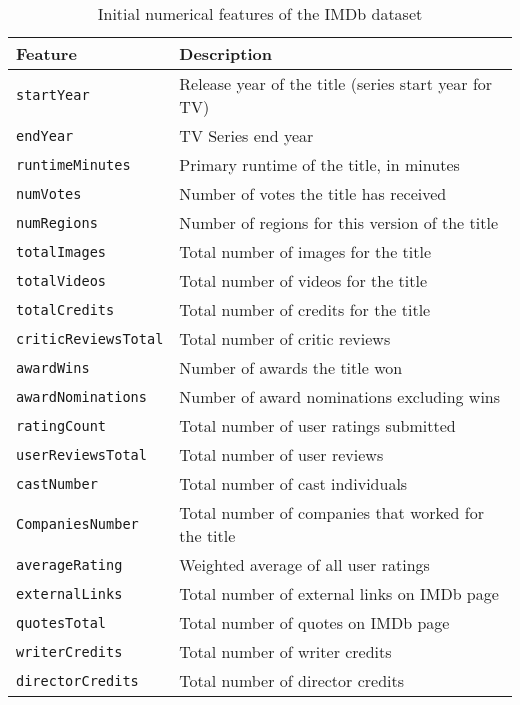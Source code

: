 \begin{table}[h]
    \centering
    \begin{tabular}{|p{4cm}|p{9cm}|}
        \hline
        \textbf{Feature} & \textbf{Description} \\ \hline
        \texttt{startYear} & Release year of the title (series start year for TV) \\ \hline
        \texttt{endYear} & TV Series end year \\ \hline
        \texttt{runtimeMinutes} & Primary runtime of the title, in minutes \\ \hline
        \texttt{numVotes} & Number of votes the title has received \\ \hline
        \texttt{numRegions} & Number of regions for this version of the title \\ \hline
        \texttt{totalImages} & Total number of images for the title \\ \hline
        \texttt{totalVideos} & Total number of videos for the title \\ \hline
        \texttt{totalCredits} & Total number of credits for the title \\ \hline
        \texttt{criticReviewsTotal} & Total number of critic reviews \\ \hline
        \texttt{awardWins} & Number of awards the title won \\ \hline
        \texttt{awardNominations} & Number of award nominations excluding wins \\ \hline
        \texttt{ratingCount} & Total number of user ratings submitted \\ \hline
        \texttt{userReviewsTotal} & Total number of user reviews \\ \hline
        \texttt{castNumber} & Total number of cast individuals \\ \hline
        \texttt{CompaniesNumber} & Total number of companies that worked for the title \\ \hline
        \texttt{averageRating} & Weighted average of all user ratings \\ \hline
        \texttt{externalLinks} & Total number of external links on IMDb page \\ \hline
        \texttt{quotesTotal} & Total number of quotes on IMDb page \\ \hline
        \texttt{writerCredits} & Total number of writer credits \\ \hline
        \texttt{directorCredits} & Total number of director credits \\ \hline
    \end{tabular}
    \caption{Initial numerical features of the IMDb dataset}
    \label{tab:initial_features_numerical}
\end{table}


